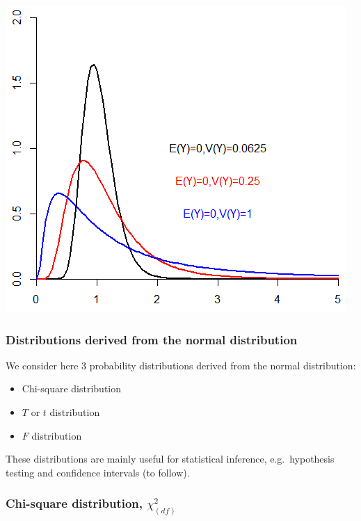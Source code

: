 \documentclass[
]{article}
\providecommand{\tightlist}{%
  \setlength{\itemsep}{0pt}\setlength{\parskip}{0pt}}
\begin{document}
\begin{center}\includegraphics[width=0.8\linewidth,height=0.8\textheight]{lognorm} \end{center}

\hypertarget{distributions-derived-from-the-normal-distribution}{%
\subsubsection{Distributions derived from the normal
distribution}\label{distributions-derived-from-the-normal-distribution}}

We consider here 3 probability distributions derived from the normal
distribution:

\begin{itemize}
\tightlist
\item
  Chi-square distribution
\item
  \(T\) or \(t\) distribution
\item
  \(F\) distribution
\end{itemize}

These distributions are mainly useful for statistical inference,
e.g.~hypothesis testing and confidence intervals (to follow).

\hypertarget{chi-square-distribution-chi2_df}{%
\subsubsection{\texorpdfstring{Chi-square distribution,
\(\chi^2_{(df)}\)}{Chi-square distribution, \textbackslash chi\^{}2\_\{(df)\}}}\label{chi-square-distribution-chi2_df}}
\end{document}
